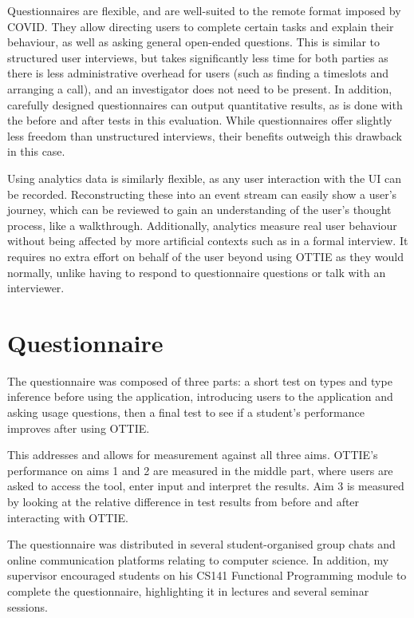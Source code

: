 \documentclass[a4paper,fleqn,oneside,12pt]{report}
\begin{document}
Questionnaires are flexible, and are well-suited to the remote format imposed by COVID. They allow directing users to complete certain tasks and explain their behaviour, as well as asking general open-ended questions. This is similar to structured user interviews, but takes significantly less time for both parties as there is less administrative overhead for users (such as finding a timeslots and arranging a call), and an investigator does not need to be present. In addition, carefully designed questionnaires can output quantitative results, as is done with the before and after tests in this evaluation. While questionnaires offer slightly less freedom than unstructured interviews, their benefits outweigh this drawback in this case.

Using analytics data is similarly flexible, as any user interaction with the UI can be recorded. Reconstructing these into an event stream can easily show a user's journey, which can be reviewed to gain an understanding of the user's thought process, like a walkthrough. Additionally, analytics measure real user behaviour without being affected by more artificial contexts such as in a formal interview. It requires no extra effort on behalf of the user beyond using OTTIE as they would normally, unlike having to respond to questionnaire questions or talk with an interviewer.

\section{Questionnaire}\label{id:h.yqiowsgjmohq}

The questionnaire was composed of three parts: a short test on types and type inference before using the application, introducing users to the application and asking usage questions, then a final test to see if a student's performance improves after using OTTIE.

This addresses and allows for measurement against all three aims. OTTIE's performance on aims 1 and 2 are measured in the middle part, where users are asked to access the tool, enter input and interpret the results. Aim 3 is measured by looking at the relative difference in test results from before and after interacting with OTTIE.

The questionnaire was distributed in several student-organised group chats and online communication platforms relating to computer science. In addition, my supervisor encouraged students on his CS141 Functional Programming module to complete the questionnaire, highlighting it in lectures and several seminar sessions.
\end{document}
